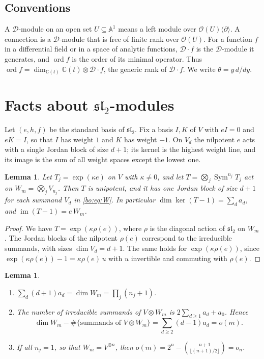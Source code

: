 \documentclass[11pt,a4paper]{article}
\newtheorem{lemma}[theorem]{Lemma}
\theoremstyle{definition}
\theoremstyle{remark}
\numberwithin{equation}{section}
\newcommand{\C}{\mathbb{C}}
\DeclareMathOperator{\ord}{ord}
\newcommand{\A}{\mathbb{A}}
\newcommand{\cD}{\mathcal{D}}
\newcommand{\cO}{\mathcal{O}}
\newcommand{\sltwo}{\mathfrak{sl}_2}
\DeclareMathOperator{\Sym}{Sym}
\DeclareMathOperator{\im}{im}
\begin{document}
\subsection*{Conventions}
A $\cD$-module on an open set $U\subseteq\A^1$ means a left module over $\cO(U)\langle\partial\rangle$. A connection is a $\cD$-module that is free of finite rank over $\cO(U)$. For a function $f$ in a differential field or in a space of analytic functions, $\cD\cdot f$ is the $\cD$-module it generates, and $\ord f$ is the order of its minimal operator. Thus $\ord f=\dim_{\C(t)}\C(t)\otimes\cD\cdot f$, the generic rank of $\cD\cdot f$. We write $\theta=y\,d/dy$.

\section{Facts about \texorpdfstring{$\sltwo$}{sl2}-modules}\label{bo:sec:rep}

Let $(e,h,f)$ be the standard basis of $\sltwo$. Fix a basis $I,K$ of $V$ with $eI=0$ and $eK=I$, so that $I$ has weight $1$ and $K$ has weight $-1$. On $V_d$ the nilpotent $e$ acts with a single Jordan block of size $d+1$; its kernel is the highest weight line, and its image is the sum of all weight spaces except the lowest one.

\begin{lemma}\label{bo:lem:jordan}
Let $T_j=\exp(\kappa e)$ on $V$ with $\kappa\ne0$, and let $T=\bigotimes_j\Sym^{n_j}T_j$ act on $W_m=\bigotimes_jV_{n_j}$. Then $T$ is unipotent, and it has one Jordan block of size $d+1$ for each summand $V_d$ in \eqref{bo:eq:W}. In particular $\dim\ker(T-1)=\sum_da_d$, and $\im(T-1)=e\,W_m$.
\end{lemma}

\begin{proof}
We have $T=\exp(\kappa\rho(e))$, where $\rho$ is the diagonal action of $\sltwo$ on $W_m$. The Jordan blocks of the nilpotent $\rho(e)$ correspond to the irreducible summands, with sizes $\dim V_d=d+1$. The same holds for $\exp(\kappa\rho(e))$, since $\exp(\kappa\rho(e))-1=\kappa\rho(e)\,u$ with $u$ invertible and commuting with $\rho(e)$.
\end{proof}

\begin{lemma}\label{bo:lem:count}
\begin{enumerate}
\item[(a)] $\sum_d(d+1)a_d=\dim W_m=\prod_j(n_j+1)$.
\item[(b)] The number of irreducible summands of $V\otimes W_m$ is $2\sum_{d\ge1}a_d+a_0$. Hence
\[
\dim W_m-\#\{\text{summands of }V\otimes W_m\}=\sum_{d\ge2}(d-1)a_d=o(m).
\]
\item[(c)] If all $n_j=1$, so that $W_m=V^{\otimes n}$, then $o(m)=2^n-\binom{n+1}{\lfloor(n+1)/2\rfloor}=o_n$.
\end{enumerate}
\end{lemma}
\end{document}
